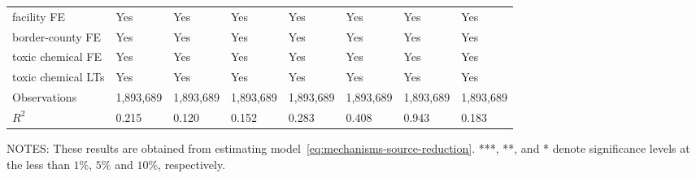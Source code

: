 \begin{table}[H]
{\begin{tabular}{@{}llllllll@{}}
            facility FE        & Yes         & Yes                  & Yes                      & Yes                 & Yes              & Yes       & Yes       \\
            border-county FE   & Yes         & Yes                  & Yes                      & Yes                 & Yes              & Yes       & Yes       \\
            toxic chemical FE  & Yes         & Yes                  & Yes                      & Yes                 & Yes              & Yes       & Yes       \\
            toxic chemical LTs & Yes         & Yes                  & Yes                      & Yes                 & Yes              & Yes       & Yes       \\ \midrule
            Observations       & 1,893,689   & 1,893,689            & 1,893,689                & 1,893,689           & 1,893,689        & 1,893,689 & 1,893,689 \\
            $R^2$              & 0.215       & 0.120                & 0.152                    & 0.283               & 0.408            & 0.943     & 0.183     \\ \bottomrule\bottomrule
        \end{tabular}%
    }
    \begin{minipage}{\columnwidth}
        \vspace{0.05in}
        \tiny NOTES: These results are obtained from estimating model~\ref{eq:mechanisms-source-reduction}. ***, **, and * denote significance levels at the less than $1\%$, $5\%$ and $10\%$, respectively.
    \end{minipage}
\end{table}